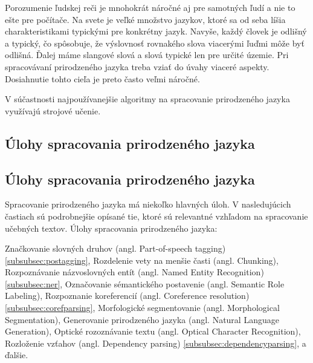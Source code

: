 Porozumenie ľudskej reči je mnohokrát náročné aj pre samotných ľudí a nie to ešte pre počítače. Na svete je veľké množstvo jazykov, ktoré sa od seba líšia charakteristikami typickými pre konkrétny jazyk. Navyše, každý človek je odlišný a typický, čo spôsobuje, že výslovnosť rovnakého slova viacerými ľuďmi môže byť odlišná. Ďalej máme slangové slová a slová typické len pre určité územie. Pri spracovávaní prirodzeného jazyka treba vziať do úvahy viaceré aspekty. Dosiahnutie tohto cieľa je preto často veľmi náročné.

V súčastnosti najpoužívanejšie algoritmy na spracovanie prirodzeného jazyka využívajú strojové učenie.


%
%
{
	\subsection{Úlohy spracovania prirodzeného jazyka}
}
{
	\subsection{Úlohy spracovania prirodzeného jazyka}
}
\label{subsec:tasksofnlp}
Spracovanie prirodzeného jazyka má niekoľko hlavných úloh. V nasledujúcich častiach sú podrobnejšie opísané tie, ktoré sú relevantné vzhľadom na spracovanie učebných textov.
Úlohy spracovania prirodzeného jazyka:~\cite{collobert2011} 
\begin{my_itemize}
	\myitem Značkovanie slovných druhov (angl. Part-of-speech tagging) \ref{subsubsec:postagging},
	\myitem Rozdelenie vety na menšie časti (angl. Chunking),
	\myitem Rozpoznávanie názvoslovných entít (angl. Named Entity Recognition) \ref{subsubsec:ner},
	\myitem Označovanie sémantického postavenie (angl. Semantic Role Labeling),
	\myitem Rozpoznanie koreferencií (angl. Coreference resolution) \ref{subsubsec:corefparsing},
	\myitem Morfologické segmentovanie (angl. Morphological Segmentation),
	\myitem Generovanie prirodzeného jazyka (angl. Natural Language Generation),
	\myitem Optické rozoznávanie textu (angl. Optical Character Recognition),
	\myitem Rozloženie vzťahov (angl. Dependency parsing) \ref{subsubsec:dependencyparsing},
	\myitem a ďalšie.
\end{my_itemize}

